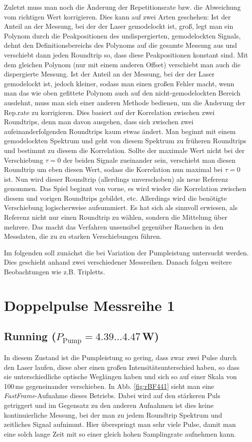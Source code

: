 \documentclass[bachelor,       %
               twoside,        %
               BCOR10mm,       %
               english,ngerman, %
               ]{GAUBM}
\begin{document}
Zuletzt muss man noch die Änderung der Repetitionsrate bzw. die Abweichung vom richtigen Wert korrigieren.
Dies kann auf zwei Arten geschehen:
Ist der Anteil an der Messung, bei der der Laser gemodelockt ist, groß, legt man ein Polynom durch die Peakpositionen des undispergierten, gemodelockten Signals, dehnt den Definitionsbereichs des Polynoms auf die gesamte Messung aus und verschiebt dann jeden Roundtrip so, dass diese Peakpositionen konstant sind.
Mit dem gleichen Polynom (nur mit einem anderen Offset) verschiebt man auch die dispergierte Messung.
Ist der Anteil an der Messung, bei der der Laser gemodelockt ist, jedoch kleiner, sodass man einen großen Fehler macht, wenn man das wie oben gefittete Polynom auch auf den nicht-gemodelockten Bereich ausdehnt, muss man sich einer anderen Methode bedienen, um die Änderung der Rep.rate zu korrigieren.
Dies basiert auf der Korrelation zwischen zwei Roundtrips, denn man davon ausgehen, dass sich zwischen zwei aufeinanderfolgenden Roundtrips kaum etwas ändert.
Man beginnt mit einem gemodelockten Spektrum und geht von diesem Spektrum zu früheren Roundtrips und bestimmt zu diesem die Korrelation.
Sollte der maximale Wert nicht bei der Verschiebung $\tau=0$ der beiden Signale zueinander sein, verschiebt man diesen Roundtrip um eben diesen Wert, sodass die Korrelation nun maximal bei $\tau=0$ ist.
Nun wird dieser Roundtrip (allerdings unverschoben) als neue Referenz genommen.
Das Spiel beginnt von vorne, es wird wieder die Korrelation zwischen diesem und vorigen Roundtrips gebildet, etc.
Allerdings wird die benötigte Verschiebung logischerweise aufsummiert.
Es hat sich als sinnvoll erwiesen, als Referenz nicht nur einen Roundtrip zu wählen, sondern die Mittelung über mehrere.
Das macht das Verfahren unsensibel gegenüber Rauschen in den Messdaten, die zu zu starken Verschiebungen führen.

Im folgenden soll zunächst die bei Variation der Pumpleistung untersucht werden.
Dies geschieht anhand zwei verschiedener Messreihen.
Danach folgen weitere Beobachtungen wie z.B. Tripletts.

\section{Doppelpulse Messreihe 1}
\subsection{Running ($P_\text{Pump}=4.39\dots4.47\,$W)}
In diesem Zustand ist die Pumpleistung so gering, dass zwar zwei Pulse durch den Laser laufen, diese aber einen großen Intensitätsunterschied haben, so dass sie unterschiedliche optische Weglängen haben und sich so auf einer Skala von 100\,ms gegeneinander verschieben.
In Abb. \ref{fig:rBF441} sieht man eine \textit{FastFrame}-Aufnahme dieses Betriebs.
Dabei wird auf den stärkeren Puls getriggert und im Gegensatz zu den anderen Aufnahmen ist dies keine kontinuierliche Messung, bei der man zu jedem Roundtrip Spektrum und zeitliches Signal aufnimmt.
Hier überspringt man sehr viele Pulse, damit man eine solch lange Zeit mit so einer gleich hohen Samplingrate aufnehmen kann.
\end{document}
